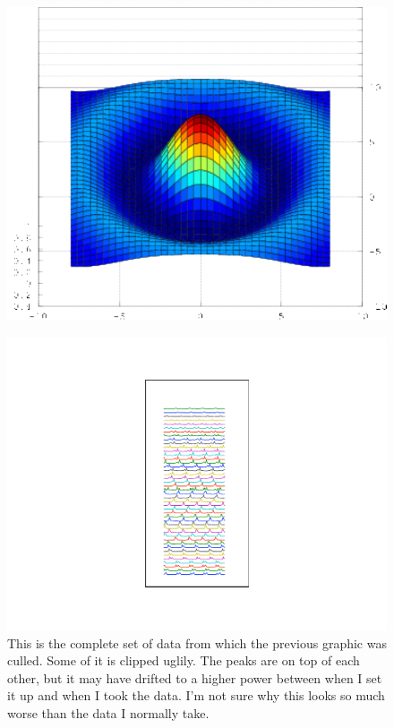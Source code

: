 \begin{figure}
\centerline{\includegraphics{thisone}}
\end{figure}

\begin{figure}
\centerline{\includegraphics{all_splittingData}}
\caption[]{\label{fig:alldata} 
This is the complete set of data from which the previous graphic was culled. Some of it is clipped uglily. The peaks are on top of each other, but it may have drifted to a higher power between when I set it up and when I took the data. I'm not sure why this looks so much worse than the data I normally take.}
\end{figure}

